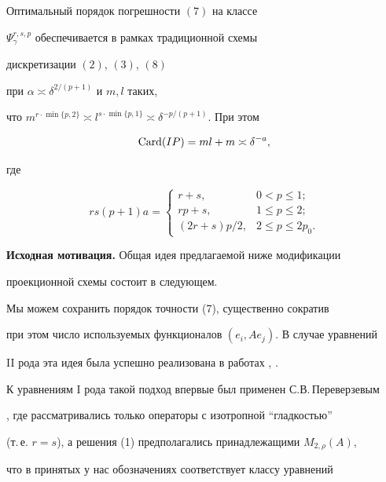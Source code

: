 \begin{thm}


Оптимальный порядок погрешности $(7)$ на классе


$\Psi_\gamma^{r,s,p}$ обеспечивается в рамках традиционной схемы


дискретизации $(2)$, $(3)$, $(8)$


при $\alpha\asymp\delta^{2/(p+1)}$ и $m,l$ таких,


что $m^{r\cdot\min\{p,2\}}\asymp l^{s\cdot\min\{p,1\}}\asymp


\delta^{-p/(p+1)}$. При этом


$$


\Card(IP)= ml+m \asymp \delta^{-a},


$$


где


$$


rs(p+1)a =


\begin{cases}


r+s, & 0<p\le 1; \\


rp+s, & 1\le p\le 2; \\


(2r+s)p/2, & 2\le p\le 2p_0.


\end{cases}


$$


\end{thm}





{\bf Исходная мотивация.} Общая идея предлагаемой ниже модификации


проекционной схемы состоит в следующем.


Мы можем сохранить порядок точности (7),  существенно сократив


при этом число используемых функционалов $(e_i,Ae_j)$. В случае уравнений


II рода эта идея была успешно реализована в работах \cite{PS}, \cite{H}.


К уравнениям I рода такой подход впервые был применен С.В.\,Переверзевым


\cite{P}, где рассматривались только операторы с изотропной ``гладкостью''


(т.\,е. $r=s$), а решения (1) предполагались принадлежащими $M_{2,\rho}(A)$,


что в принятых у нас обозначениях соответствует классу уравнений


